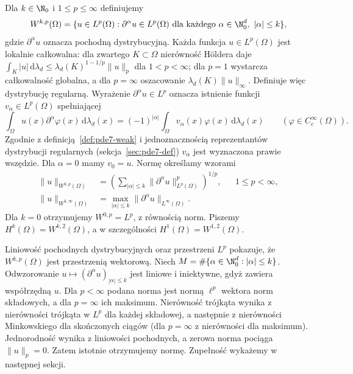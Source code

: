 \begin{definicja}[Przestrzenie $W^{k,p}$]
\label{def:pde9-Wkp}
Dla $k\in\N_0$ i $1\le p\le\infty$ definiujemy
\[
 W^{k,p}(\Omega)=\{u\in L^p(\Omega):
  \partial^\alpha u\in L^p(\Omega)
  \text{ dla każdego }\alpha\in\N_0^d,\ |\alpha|\le k\},
\]
gdzie $\partial^\alpha u$ oznacza pochodną dystrybucyjną.
Każda funkcja $u\in L^p(\Omega)$ jest lokalnie całkowalna:
dla zwartego $K\subset\Omega$ nierówność Höldera daje
$\int_K |u|\,\mathrm d\lambda_d
\le\lambda_d(K)^{1-1/p}\|u\|_p$ dla $1<p<\infty$;
dla $p=1$ wystarcza całkowalność globalna,
a dla $p=\infty$ oszacowanie
$\lambda_d(K)\|u\|_\infty$. Definiuje więc dystrybucję regularną.
Wyrażenie $\partial^\alpha u\in L^p$ oznacza istnienie
funkcji $v_\alpha\in L^p(\Omega)$ spełniającej
\[
 \int_\Omega u(x)\partial^\alpha\varphi(x)\,\mathrm d\lambda_d(x)
 =(-1)^{|\alpha|}\int_\Omega v_\alpha(x)\varphi(x)\,
 \mathrm d\lambda_d(x)
 \qquad(\varphi\in C_c^\infty(\Omega)).
\]
Zgodnie z definicją~\ref{def:pde7-weak} i jednoznacznością
reprezentantów dystrybucji regularnych (sekcja~\ref{sec:pde7-def})
$v_\alpha$ jest wyznaczona prawie wszędzie.
Dla $\alpha=0$ mamy $v_0=u$. Normę określamy wzorami
\begin{align*}
 \|u\|_{W^{k,p}(\Omega)}
  &=\left(\sum_{|\alpha|\le k}\|\partial^\alpha u\|_{L^p(\Omega)}^p
    \right)^{1/p},&&1\le p<\infty,\\
 \|u\|_{W^{k,\infty}(\Omega)}
  &=\max_{|\alpha|\le k}\|\partial^\alpha u\|_{L^\infty(\Omega)}.
\end{align*}
Dla $k=0$ otrzymujemy $W^{0,p}=L^p$, z równością norm.
Piszemy $H^k(\Omega)=W^{k,2}(\Omega)$,
a w szczególności $H^1(\Omega)=W^{1,2}(\Omega)$.
\end{definicja}

Liniowość pochodnych dystrybucyjnych oraz przestrzeni $L^p$
pokazuje, że $W^{k,p}(\Omega)$ jest przestrzenią wektorową.
Niech $M=\#\{\alpha\in\N_0^d:|\alpha|\le k\}$.
Odwzorowanie $u\mapsto(\partial^\alpha u)_{|\alpha|\le k}$
jest liniowe i iniektywne, gdyż zawiera współrzędną $u$.
Dla $p<\infty$ podana norma jest normą $\ell^p$
wektora norm składowych, a dla $p=\infty$ ich maksimum.
Nierówność trójkąta wynika z nierówności trójkąta w $L^p$
dla każdej składowej, a następnie z nierówności Minkowskiego
dla skończonych ciągów (dla $p=\infty$ z nierówności dla maksimum).
Jednorodność wynika z liniowości pochodnych, a zerowa norma
pociąga $\|u\|_p=0$. Zatem istotnie otrzymujemy normę.
Zupełność wykażemy w następnej sekcji.

